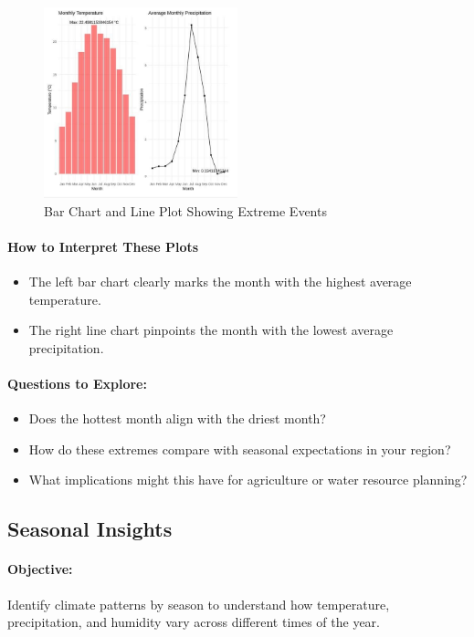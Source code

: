 \begin{figure}[h]
\centering
\includegraphics[width=0.5\textwidth]{figures/barchart1.jpg}
\caption{Bar Chart and Line Plot Showing Extreme Events}
\label{fig:dual_extremes}
\end{figure}

\paragraph{How to Interpret These Plots}
\begin{itemize}
  \item The left bar chart clearly marks the month with the highest average temperature.
  \item The right line chart pinpoints the month with the lowest average precipitation.
\end{itemize}

\paragraph{Questions to Explore:}
\begin{itemize}
  \item Does the hottest month align with the driest month?
  \item How do these extremes compare with seasonal expectations in your region?
  \item What implications might this have for agriculture or water resource planning?
\end{itemize}

\subsection*{Seasonal Insights}

\paragraph{Objective:} Identify climate patterns by season to understand how temperature, precipitation, and humidity vary across different times of the year.

